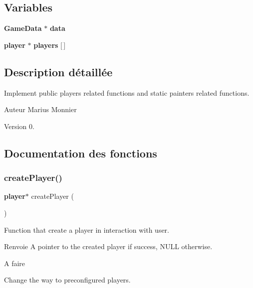 \subsection*{Variables}
\begin{DoxyCompactItemize}
\item 
\textbf{ Game\+Data} $\ast$ \textbf{ data}
\item 
\mbox{\label{players_8c_aa6e0d10ac9dacf902c351a3cbb8a474d}} 
\textbf{ player} $\ast$ {\bfseries players} [$\,$]
\end{DoxyCompactItemize}


\subsection{Description détaillée}
Implement public players related functions and static painters related functions. 

\begin{DoxyAuthor}{Auteur}
Marius Monnier 
\end{DoxyAuthor}
\begin{DoxyVersion}{Version}
0. 
\end{DoxyVersion}


\subsection{Documentation des fonctions}
\mbox{\label{players_8c_a232779641e812885a1fbc89b620b4848}} 
\subsubsection{create\+Player()}
{\footnotesize\ttfamily \textbf{ player}$\ast$ create\+Player (\begin{DoxyParamCaption}{ }\end{DoxyParamCaption})}



Function that create a player in interaction with user. 

\begin{DoxyReturn}{Renvoie}
A pointer to the created player if success, N\+U\+LL otherwise.
\end{DoxyReturn}
\begin{DoxyRefDesc}{A faire}
\item[\textbf{ A faire}]Change the way to preconfigured players. \end{DoxyRefDesc}



